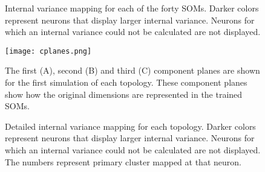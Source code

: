\begin{figure}
\centering
\begin{minipage}{\textwidth}
\caption{Internal variance mapping for each of the forty SOMs. Darker colors
represent neurons that display larger internal variance. Neurons for which
an internal variance could not be calculated are not displayed.}
\label{ten}
\end{minipage}
\end{figure}

\begin{figure}
\begin{minipage}{\textwidth}
  \texttt{[image: cplanes.png]}
  \caption{The first (A), second (B) and third (C) component planes are shown
for the first simulation of each topology.  These component planes show how
the original dimensions are represented in the trained SOMs.}
  \label{cplanes}
\end{minipage}\end{figure}


\begin{figure}
\centering
\begin{minipage}{\textwidth}
\caption{Detailed internal variance mapping for each topology. Darker colors
represent neurons that display larger internal variance. Neurons for which
an internal variance could not be calculated are not displayed. The numbers
represent primary cluster mapped at that neuron.}
\label{cluster}
\end{minipage}
\end{figure}




